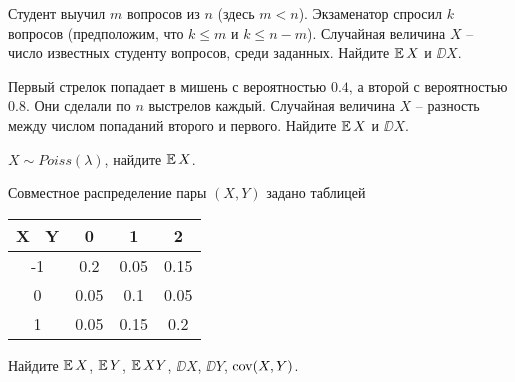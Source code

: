 \begin{problem}
    Студент выучил $m$ вопросов из $n$ (здесь $m < n$).
    Экзаменатор спросил $k$ вопросов (предположим, что $k \leq m$ и $k \leq n - m$).
    Случайная величина $X$ -- число известных студенту вопросов, среди заданных.
    Найдите $\operatorname{\mathbb{E}} X$ и $\DD X$.
\end{problem}



\begin{problem}
    Первый стрелок попадает в мишень с вероятностью $0.4$, а второй с вероятностью $0.8$.
    Они сделали по $n$ выстрелов каждый.
    Случайная величина $X$ -- разность между числом попаданий второго и первого.
    Найдите $\operatorname{\mathbb{E}} X$ и $\DD X$.
\end{problem}

\begin{problem}
    $X \sim Poiss(\lambda)$, найдите $\operatorname{\mathbb{E}} X$.
\end{problem}

\begin{problem}
    Совместное распределение пары $(X, Y)$ задано таблицей
    \begin{center}
    \begin{tabular}{c|c|c|c}
        X \ Y & 0 & 1 & 2 \\
        \hline
        -1 & 0.2 & 0.05 & 0.15 \\
        \hline
        0 & 0.05 & 0.1 & 0.05 \\
        \hline
        1 & 0.05 & 0.15 & 0.2 \\
    \end{tabular}
    \end{center}
    Найдите $\operatorname{\mathbb{E}} X$, $\operatorname{\mathbb{E}} Y$, $\operatorname{\mathbb{E}} XY$, $\DD X$, $\DD Y$, $\operatorname{\mathrm{cov}}(X, Y)$. 
\end{problem}

